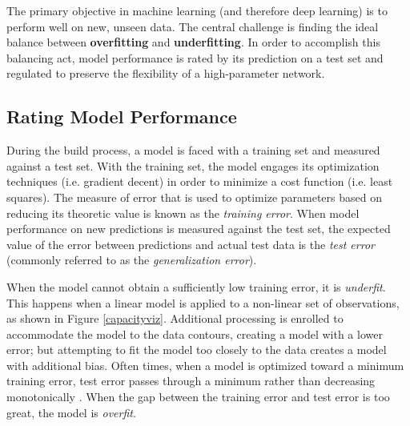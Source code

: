The primary objective in machine learning (and therefore deep learning) is to perform well on new, unseen data.  The central challenge is finding the ideal balance between \textbf{overfitting} and \textbf{underfitting}.  In order to accomplish this balancing act, model performance is rated by its prediction on a test set and regulated to preserve the flexibility of a high-parameter network.

\subsection{Rating Model Performance}


During the build process, a model is faced with a training set and measured against a test set.  With the training set, the model engages its optimization techniques (i.e. gradient decent) in order to minimize a cost function (i.e. least squares).  The measure of error that is used to optimize parameters based on reducing its theoretic value is known as the \textit{training error}.  When model performance on new predictions is measured against the test set, the expected value of the error between predictions and actual test data is the \textit{test error} (commonly referred to as the \textit{generalization error}). \cite{Goodfellow-et-al-2016}

 When the model cannot obtain a sufficiently low training error, it is \textit{underfit}.  This happens when a linear model is applied to a non-linear set of observations, as shown in Figure \ref{capacityviz}.  Additional processing is enrolled to accommodate the model to the data contours, creating a model with a lower error; but attempting to fit the model too closely to the data creates a model with additional bias.  Often times, when a model is optimized toward a minimum training error, test error passes through a minimum rather than decreasing monotonically \cite{mackay1992bayesian}.  When the gap between the training error and test error is too great, the model is \textit{overfit}.
 
